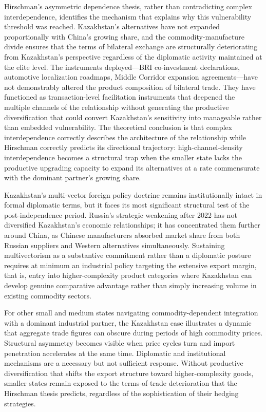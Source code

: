 \documentclass[12pt]{article}
\begin{document}
Hirschman's asymmetric dependence thesis, rather than contradicting complex interdependence, identifies the mechanism that explains why this vulnerability threshold was reached. Kazakhstan's alternatives have not expanded proportionally with China's growing share, and the commodity-manufacture divide ensures that the terms of bilateral exchange are structurally deteriorating from Kazakhstan's perspective regardless of the diplomatic activity maintained at the elite level. The instruments deployed---BRI co-investment declarations, automotive localization roadmaps, Middle Corridor expansion agreements---have not demonstrably altered the product composition of bilateral trade. They have functioned as transaction-level facilitation instruments that deepened the multiple channels of the relationship without generating the productive diversification that could convert Kazakhstan's sensitivity into manageable rather than embedded vulnerability. The theoretical conclusion is that complex interdependence correctly describes the architecture of the relationship while Hirschman correctly predicts its directional trajectory: high-channel-density interdependence becomes a structural trap when the smaller state lacks the productive upgrading capacity to expand its alternatives at a rate commensurate with the dominant partner's growing share.

Kazakhstan's multi-vector foreign policy doctrine remains institutionally intact in formal diplomatic terms, but it faces its most significant structural test of the post-independence period. Russia's strategic weakening after 2022 has not diversified Kazakhstan's economic relationships; it has concentrated them further around China, as Chinese manufacturers absorbed market share from both Russian suppliers and Western alternatives simultaneously. Sustaining multivectorism as a substantive commitment rather than a diplomatic posture requires at minimum an industrial policy targeting the extensive export margin, that is, entry into higher-complexity product categories where Kazakhstan can develop genuine comparative advantage rather than simply increasing volume in existing commodity sectors.

For other small and medium states navigating commodity-dependent integration with a dominant industrial partner, the Kazakhstan case illustrates a dynamic that aggregate trade figures can obscure during periods of high commodity prices. Structural asymmetry becomes visible when price cycles turn and import penetration accelerates at the same time. Diplomatic and institutional mechanisms are a necessary but not sufficient response. Without productive diversification that shifts the export structure toward higher-complexity goods, smaller states remain exposed to the terms-of-trade deterioration that the Hirschman thesis predicts, regardless of the sophistication of their hedging strategies.
\end{document}
